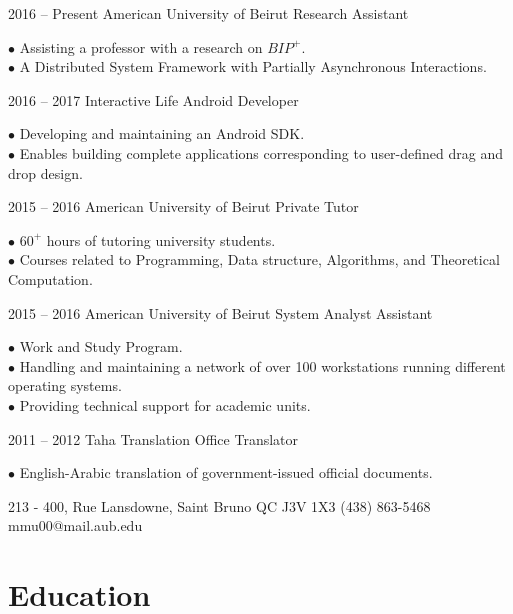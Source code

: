 \documentclass{tccv}
\begin{document}
\begin{eventlist}

\item{2016 -- Present}
     {American University of Beirut}
     {Research Assistant}

$\bullet$ Assisting a professor with a research on $BIP^+$.\\
$\bullet$ A Distributed System Framework with Partially Asynchronous Interactions.

\item{2016 -- 2017}
     {Interactive Life}
     {Android Developer}

$\bullet$ Developing and maintaining an Android SDK.\\
$\bullet$ Enables building complete applications corresponding to user-defined drag and drop design.

\item{2015 -- 2016}
     {American University of Beirut}
     {Private Tutor}

$\bullet$ $60^+$ hours of tutoring university students.\\
$\bullet$ Courses related to Programming, Data structure, Algorithms, and Theoretical Computation.

\item{2015 -- 2016}
     {American University of Beirut}
     {System Analyst Assistant}

$\bullet$ Work and Study Program.\\
$\bullet$ Handling and maintaining a network of over 100 workstations running different operating systems. \\
$\bullet$ Providing technical support for academic units.

\item{2011 -- 2012}
     {Taha Translation Office}
     {Translator}

$\bullet$ English-Arabic translation of government-issued official documents.

\end{eventlist}



\personal
    {213 - 400,  Rue Lansdowne, Saint Bruno \hspace{1cm} QC J3V 1X3}
    {(438) 863-5468}
    {mmu00@mail.aub.edu}

\section{Education}
\end{document}
